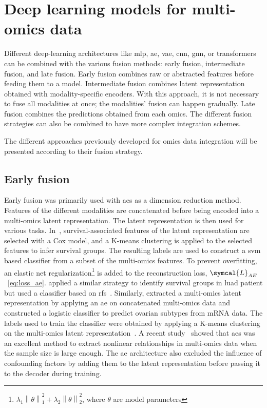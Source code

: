 \documentclass[../main.tex]{subfiles}
\begin{document}
\section[Deep learning and multi-omics data]{Deep learning models for multi-omics data}
	Different deep-learning architectures like \gls{mlp}, \gls{ae}, \gls{vae}, \gls{cnn}, \gls{gnn}, or transformers can be combined with the various fusion methods: early fusion, intermediate fusion, and late fusion.
	Early fusion combines raw or abstracted features before feeding them to a model.
	Intermediate fusion combines latent representation obtained with modality-specific encoders.
	With this approach, it is not necessary to fuse all modalities at once; the modalities' fusion can happen gradually.
	Late fusion combines the predictions obtained from each omics.
	The different fusion strategies can also be combined to have more complex integration schemes.

	The different approaches previously developed for omics data integration will be presented according to their fusion strategy.

	\subsection{Early fusion}
		Early fusion was primarily used with \glspl{ae} as a dimension reduction method.
		Features of the different modalities are concatenated before being encoded into a multi-omics latent representation.
		The latent representation is then used for various tasks.
		In~\cite{Chaudhary2018}, survival-associated features of the latent representation are selected with a Cox model, and a K-means clustering is applied to the selected features to infer survival groups.
		The resulting labels are used to construct a \gls{svm} based classifier from a subset of the multi-omics features.
		To prevent overfitting, an elastic net regularization\footnote{\(\lambda_{1} \left\|\theta\right\|_{1}^{2} + \lambda_{2} \left\|\theta\right\|_{2}^{2}\), where \(\theta\) are model parameters} is added to the reconstruction loss, \(\symcal{L}_{AE}\)~\cref{eq:loss_ae}.
		\citeauthor{Lee2020} applied a similar strategy to identify survival groups in \gls{luad} patient but used a classifier based on \glspl{rf}~\cite{Lee2020}.
		Similarly, \citeauthor{Guo2020} extracted a multi-omics latent representation by applying an \gls{ae} on concatenated multi-omics data and constructed a logistic classifier to predict ovarian subtypes from mRNA data.
		The labels used to train the classifier were obtained by applying a K-means clustering on the multi-omics latent representation~\cite{Guo2020}.
		A recent study~\cite{Yu2022} showed that \glspl{ae} was an excellent method to extract nonlinear relationships in multi-omics data when the sample size is large enough.
		The \gls{ae} architecture also excluded the influence of confounding factors by adding them to the latent representation before passing it to the decoder during training.
\end{document}

